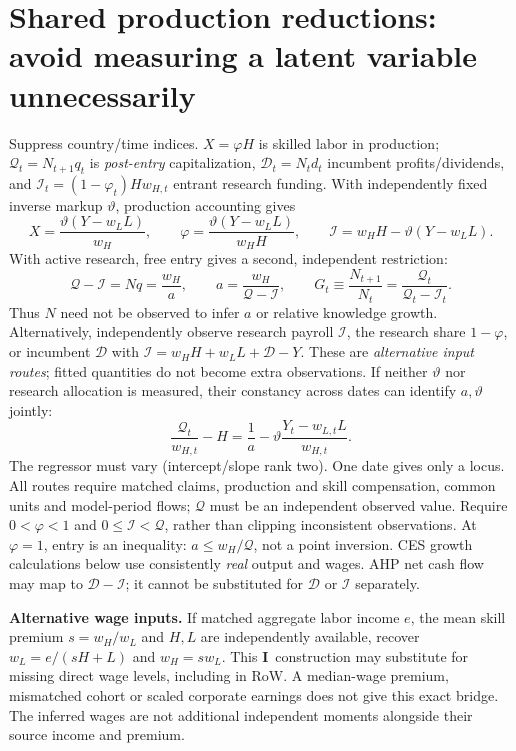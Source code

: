 \documentclass[10pt,a4paper,landscape]{article}
\newcommand{\Q}{\mathcal Q}\newcommand{\I}{\mathcal I}\newcommand{\D}{\mathcal D}
\newcommand{\indirect}{\textbf{I}}
\begin{document}
\section{Shared production reductions: avoid measuring a latent variable unnecessarily}
Suppress country/time indices. $X=\varphi H$ is skilled labor in production; $\Q_t=N_{t+1}q_t$ is \emph{post-entry} capitalization, $\D_t=N_td_t$ incumbent profits/dividends, and $\I_t=(1-\varphi_t)Hw_{H,t}$ entrant research funding. With independently fixed inverse markup $\vartheta$, production accounting gives
\begin{equation}\label{eq:allocation}
 X=\frac{\vartheta(Y-w_LL)}{w_H},\qquad
 \varphi=\frac{\vartheta(Y-w_LL)}{w_HH},\qquad
 \I=w_HH-\vartheta(Y-w_LL).
 \tag{P1}
\end{equation}
With active research, free entry gives a second, independent restriction:
\begin{equation}\label{eq:entry}
 \Q-\I=Nq=\frac{w_H}{a},\qquad
 a=\frac{w_H}{\Q-\I},\qquad
 G_t\equiv\frac{N_{t+1}}{N_t}=\frac{\Q_t}{\Q_t-\I_t}.
 \tag{P2}
\end{equation}
Thus $N$ need not be observed to infer $a$ or relative knowledge growth. Alternatively, independently observe research payroll $\I$, the research share $1-\varphi$, or incumbent $\D$ with $\I=w_HH+w_LL+\D-Y$. These are \emph{alternative input routes}; fitted quantities do not become extra observations. If neither $\vartheta$ nor research allocation is measured, their constancy across dates can identify $a,\vartheta$ jointly:
\begin{equation}\label{eq:joint}
 \frac{\Q_t}{w_{H,t}}-H
 =\frac1a-\vartheta\frac{Y_t-w_{L,t}L}{w_{H,t}}.
 \tag{P3}
\end{equation}
The regressor must vary (intercept/slope rank two). One date gives only a locus. All routes require matched claims, production and skill compensation, common units and model-period flows; $\Q$ must be an independent observed value. Require $0<\varphi<1$ and $0\leq\I<\Q$, rather than clipping inconsistent observations. At $\varphi=1$, entry is an inequality: $a\leq w_H/\Q$, not a point inversion. CES growth calculations below use consistently \emph{real} output and wages. AHP net cash flow may map to $\D-\I$; it cannot be substituted for $\D$ or $\I$ separately.

\textbf{Alternative wage inputs.} If matched aggregate labor income $e$, the mean skill premium $s=w_H/w_L$ and $H,L$ are independently available, recover $w_L=e/(sH+L)$ and $w_H=sw_L$. This \indirect\ construction may substitute for missing direct wage levels, including in RoW. A median-wage premium, mismatched cohort or scaled corporate earnings does not give this exact bridge. The inferred wages are not additional independent moments alongside their source income and premium.
\end{document}
